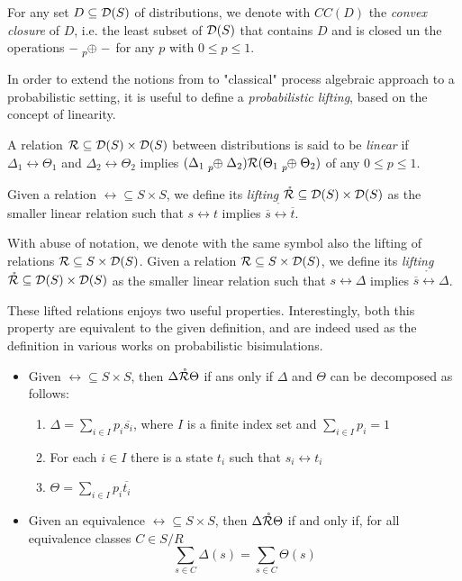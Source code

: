 For any set $D \subseteq \mathcal{D}(S)$ of distributions, we denote with $CC(D)$ the \textit{convex closure} of $D$, i.e. the least subset of $\mathcal{D}(S)$ that contains $D$ and is closed un the operations $ - \psum{p} - $ for any $p$ with $0 \leq p \leq 1$.


In order to extend the notions from to "classical" process algebraic approach to a probabilistic setting, it is useful to define a \textit{probabilistic lifting}, based on the concept of linearity.

A relation $\mathcal{R} \subseteq \mathcal{D}(S) \times \mathcal{D}(S)$  between distributions is said to be \textit{linear} if $\Delta_1 \rel \Theta_1$ and $\Delta_2 \rel \Theta_2$ implies $(\Delta_1 \psum{p} \Delta_2) \rel (\Theta_1 \psum{p} \Theta_2)$ of any $0 \leq p \leq 1$.

Given a relation $\rel \subseteq S \times S$, we define its \textit{lifting} $\mathring{\mathcal{R}} \subseteq \mathcal{D}(S) \times \mathcal{D}(S)$ as the smaller linear relation such that $s \rel t$ implies $\overline{s} \mathring{\rel} \overline{t}$.

With abuse of notation, we denote with the same symbol also the lifting of relations $\mathcal{R} \subseteq S \times \mathcal{D}(S)$. Given a relation $\mathcal{R} \subseteq S \times \mathcal{D}(S)$, we define its \textit{lifting} $\mathring{\mathcal{R}} \subseteq \mathcal{D}(S) \times \mathcal{D}(S)$ as the smaller linear relation such that $s \rel \Delta$ implies $\overline{s} \mathring{\rel} \Delta$.


These lifted relations enjoys two useful properties. Interestingly, both this property are equivalent to the given definition, and are indeed used as the definition in various works on probabilistic bisimulations. \begin{itemize}
\item Given $\rel \subseteq S \times S$, then $\Delta \mathring{\mathcal{R}} \Theta$ if ans only if $\Delta$ and $\Theta$ can be decomposed as follows: \begin{enumerate}
\item $\Delta = \sum_{i \in I} p_i \overline{s_i}$, where $I$ is a finite index set and $\sum_{i \in I}p_i = 1$
\item For each $i \in I$ there is a state $t_i$ such that $s_i \rel t_i$
\item $\Theta = \sum_{i\in I}p_i\overline{t_i}$ 
\end{enumerate}
\item Given an equivalence $\rel \subseteq S \times S$, then $\Delta \mathring{\mathcal{R}} \Theta$ if and only if, for all equivalence classes $C \in S/R$
\[\sum_{s\in C} \Delta(s) = \sum_{s\in C} \Theta(s)\]
\end{itemize}


